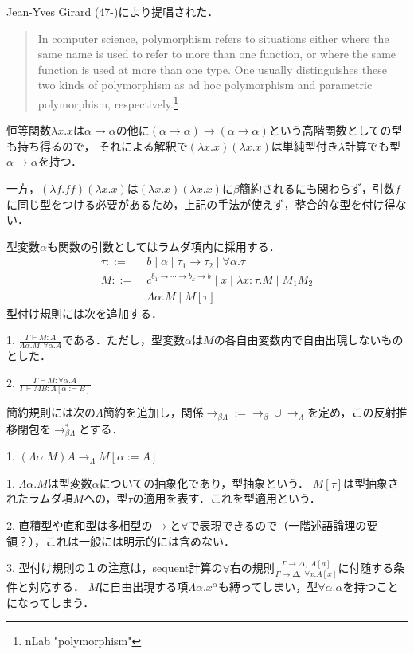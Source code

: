 \documentclass[uplatex, dvipdfmx]{jsreport}
\begin{document}
Jean-Yves Girard (47-)により提唱された．
\begin{quote}
    In computer science, polymorphism refers to situations either where the same name is used to refer to more than one function, or where the same function is used at more than one type. One usually distinguishes these two kinds of polymorphism as ad hoc polymorphism and parametric polymorphism, respectively.\footnote{nLab "polymorphism"}
\end{quote}

\begin{example}
    恒等関数$\lambda x.x$は$\alpha\to\alpha$の他に$(\alpha\to\alpha)\to(\alpha\to\alpha)$という高階関数としての型も持ち得るので，
    それによる解釈で$(\lambda x.x)(\lambda x.x)$は単純型付き$\lambda$計算でも型$\alpha\to\alpha$を持つ．

    一方，$(\lambda f.ff)(\lambda x.x)$は$(\lambda x.x)(\lambda x.x)$に$\beta$簡約されるにも関わらず，引数$f$に同じ型をつける必要があるため，上記の手法が使えず，整合的な型を付け得ない．
\end{example}
\begin{shadebox}\begin{definition}
    型変数$\alpha$も関数の引数としてはラムダ項内に採用する．
    \begin{align*}
        \tau ::=&\; b\mid \alpha\mid \tau_1\to\tau_2 \mid \forall\alpha.\tau \\
        M ::=&\; c^{b_1\to\cdots\to b_k\to b}\mid x\mid \lambda x:\tau.M\mid M_1M_2 \\
        &\; \Lambda\alpha.M\mid M[\tau]
    \end{align*}
    型付け規則には次を追加する．

    1. $\frac{\Gamma\vdash M:A}{\Lambda\alpha.M:\forall\alpha.A}$である．ただし，型変数$\alpha$は$M$の各自由変数内で自由出現しないものとした．

    2. $\frac{\Gamma\vdash M:\forall\alpha.A}{\Gamma\vdash MB:A[\alpha:=B]}$

    簡約規則には次の$\Lambda$簡約を追加し，関係$\to_{\beta\Lambda}:=\to_\beta\cup\to_\Lambda$を定め，この反射推移閉包を$\to_{\beta\Lambda}^*$とする．

    1. $(\Lambda\alpha.M)A\to_\Lambda M[\alpha:=A]$
\end{definition}\end{shadebox}
\begin{remark}
    1. $\Lambda\alpha.M$は型変数$\alpha$についての抽象化であり，型抽象という．
    $M[\tau]$は型抽象されたラムダ項$M$への，型$\tau$の適用を表す．これを型適用という．

    2. 直積型や直和型は多相型の$\to$と$\forall$で表現できるので（一階述語論理の要領？），これは一般には明示的には含めない．

    3. 型付け規則の１の注意は，sequent計算の$\forall$右の規則$\frac{\Gamma\to\Delta,\;A[a]}{\Gamma\to\Delta,\;\forall x.A[x]}$に付随する条件と対応する．
    $M$に自由出現する項$\Lambda\alpha.x^\alpha$も縛ってしまい，型$\forall\alpha.\alpha$を持つことになってしまう．
\end{remark}
\end{document}
